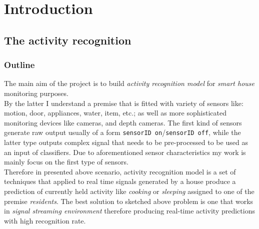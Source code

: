 \documentclass[11pt, a4paper, pdflatex, leqno, twoside, openright]{report}
\begin{document}
\chapter{Introduction\label{ch:introduction}} %
\setcounter{page}{1}

  \section{The activity recognition}
    \subsection{Outline} %
The main aim of the project is to build \emph{activity recognition model} for \emph{smart house} monitoring purposes.\\
By the latter I understand a premise that is fitted with variety of sensors like: motion, door, appliances, water, item, etc.; as well as more sophisticated monitoring devices like cameras, and depth cameras. The first kind of sensors generate raw output usually of a form \texttt{sensorID on}/\texttt{sensorID off}, while the latter type outputs complex signal that needs to be pre-processed to be used as an input of classifiers. Due to aforementioned sensor characteristics my work is mainly focus on the first type of sensors.\\
Therefore in presented above scenario, activity recognition model is a set of techniques that applied to real time signals generated by a house produce a prediction of currently held activity like \emph{cooking} or \emph{sleeping} assigned to one of the premise \emph{residents}. The best solution to sketched above problem is one that works in \emph{signal streaming environment} therefore producing real-time activity predictions with high recognition rate.
\end{document}
